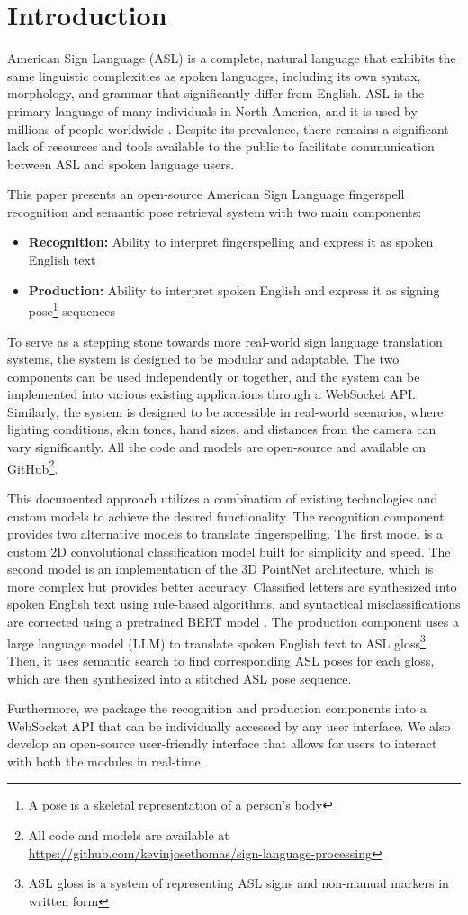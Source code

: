 \documentclass[../paper.tex]{subfiles}
\begin{document}
\section{Introduction}
American Sign Language (ASL) is a complete, natural language that exhibits the same linguistic complexities as spoken languages, including its own syntax, morphology, and grammar that significantly differ from English. ASL is the primary language of many individuals in North America, and it is used by millions of people worldwide \cite{asl_stats}. Despite its prevalence, there remains a significant lack of resources and tools available to the public to facilitate communication between ASL and spoken language users.

This paper presents an open-source American Sign Language fingerspell recognition and semantic pose retrieval system with two main components:

\begin{itemize}
    \item \textbf{Recognition:} Ability to interpret fingerspelling and express it as spoken English text
    \item \textbf{Production:} Ability to interpret spoken English and express it as signing pose\footnote{A pose is a skeletal representation of a person's body} sequences
\end{itemize}

To serve as a stepping stone towards more real-world sign language translation systems, the system is designed to be modular and adaptable. The two components can be used independently or together, and the system can be implemented into various existing applications through a WebSocket API. Similarly, the system is designed to be accessible in real-world scenarios, where lighting conditions, skin tones, hand sizes, and distances from the camera can vary significantly. All the code and models are open-source and available on GitHub\footnote{All code and models are available at \url{https://github.com/kevinjosethomas/sign-language-processing}}.

This documented approach utilizes a combination of existing technologies and custom models to achieve the desired functionality. The recognition component provides two alternative models to translate fingerspelling. The first model is a custom 2D convolutional classification model built for simplicity and speed. The second model is an implementation of the 3D PointNet \cite{PointNet} architecture, which is more complex but provides better accuracy. Classified letters are synthesized into spoken English text using rule-based algorithms, and syntactical misclassifications are corrected using a pretrained BERT model \cite{Neuspell}. The production component uses a large language model (LLM) to translate spoken English text to ASL gloss\footnote{ASL gloss is a system of representing ASL signs and non-manual markers in written form}. Then, it uses semantic search to find corresponding ASL poses for each gloss, which are then synthesized into a stitched ASL pose sequence.

Furthermore, we package the recognition and production components into a WebSocket API that can be individually accessed by any user interface. We also develop an open-source user-friendly interface that allows for users to interact with both the modules in real-time. 
\end{document}

